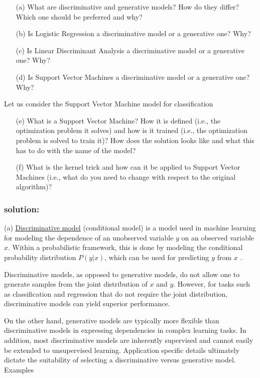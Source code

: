 \documentclass[a4paper,12pt,titlepage]{article} %
\begin{document}
\begin{itemize}
\item[(a)] What are discriminative and generative models? How do they differ? Which one should be preferred and why?
\item[(b)] Is Logistic Regression a discriminative model or a generative one? Why?
\item[(c)] Is Linear Discriminant Analysis a discriminative model or a generative one? Why?
\item[(d)] Is Support Vector Machines a discriminative model or a generative one? Why?
\end{itemize}

Let us consider the Support Vector Machine model for classification

\begin{itemize}
\item[(e)] What is a Support Vector Machine? How it is defined (i.e., the optimization problem it solves) and how is it trained (i.e., the optimization problem is solved to train it)? How does the solution looks like and what this has to do with the name of the model?
\item[(f)] What is the kernel trick and how can it be applied to Support Vector Machines (i.e., what do you need to change with respect to the original algorithm)?
\end{itemize}

\subsubsection{solution:}
(a) 
\underline{Discriminative model} (conditional model) is a model used in machine learning for modeling the dependence of an unobserved variable $ y $ on an observed variable $ x $. Within a probabilistic framework, this is done by modeling the conditional probability distribution $ P ( y | x ) $, which can be used for predicting $ y $ from $ x $ .

Discriminative models, as opposed to generative models, do not allow one to generate samples from the joint distribution of $ x $ and $ y $. However, for tasks such as classification and regression that do not require the joint distribution, discriminative models can yield superior performance.

On the other hand, generative models are typically more flexible than discriminative models in expressing dependencies in complex learning tasks. In addition, most discriminative models are inherently supervised and cannot easily be extended to unsupervised learning. Application specific details ultimately dictate the suitability of selecting a discriminative versus generative model.
Examples
\end{document}
